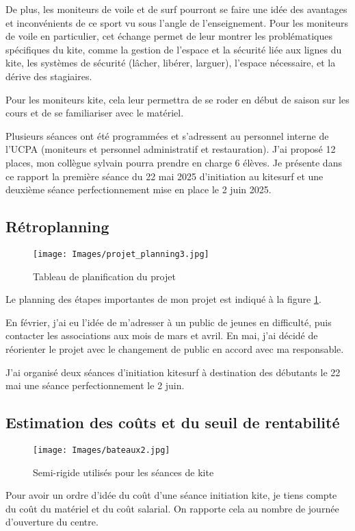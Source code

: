 \documentclass[11pt,a4paper]{report}
\begin{document}
De plus, les moniteurs de voile et de surf pourront se faire une idée des
avantages et inconvénients de ce sport vu sous l'angle de l'enseignement.
Pour les moniteurs de voile en particulier, cet échange permet
de leur montrer les problématiques spécifiques du kite, 
comme la gestion de l'espace et la sécurité liée aux lignes du kite, 
les  systèmes de sécurité 
(lâcher, libérer, larguer), l'espace nécessaire, et la dérive
des stagiaires.

Pour les moniteurs kite, cela leur permettra de se roder en début de
saison sur les cours et de se familiariser avec le matériel.

Plusieurs séances ont été programmées et s'adressent au personnel 
interne de l'UCPA (moniteurs et personnel administratif et
restauration). J'ai  proposé 12 places, mon collègue sylvain
pourra prendre en charge 6 élèves.
Je présente dans ce rapport la première séance du 22 mai 2025 d'initiation 
au kitesurf et une deuxième séance perfectionnement mise en place
le 2 juin 2025.

\subsection{Rétroplanning}
\begin{figure}[h]
\centering
\texttt{[image: Images/projet\_planning3.jpg]} 
\caption{Tableau de planification du projet \label{gantt}}
\end{figure}
Le planning des étapes importantes de mon projet est indiqué
à la figure \ref{gantt}. 

En février, j'ai eu l'idée de m'adresser à un public
de jeunes en difficulté, puis contacter les associations aux mois de mars et avril. 
En mai, j'ai décidé  de  réorienter 
le projet avec le changement de public en accord avec
ma responsable. 

J'ai organisé deux séances d'initiation kitesurf à destination des
débutants le 22 mai une séance perfectionnement le 2 juin. 


\subsection{Estimation des co\^uts et du seuil de rentabilité}

\begin{figure}
\centering
\texttt{[image: Images/bateaux2.jpg]} 
\caption{Semi-rigide utilisés pour les séances de kite\label{bateaux}}
\end{figure}
Pour avoir un ordre d'idée du coût d'une séance initiation kite, je
tiens compte du co\^ut du matériel et du co\^ut salarial. On rapporte 
cela au nombre de journée d'ouverture du centre.
\end{document}
